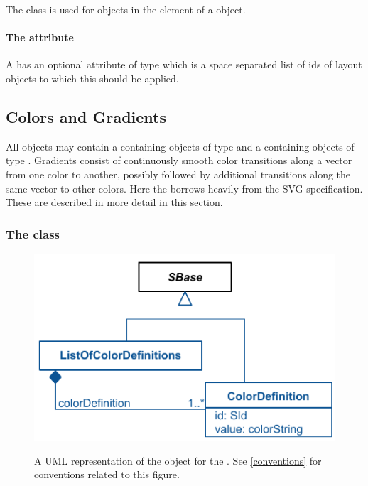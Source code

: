 The \LocalStyle class is used for objects in the \ListOfLocalStyles element of a 
\LocalRenderInformation object.

\paragraph{The \fixttspace{} attribute}

A \LocalStyle has an optional attribute  of type
 which is a space separated list of ids of layout objects to 
which this \Style should be applied.


\subsection{Colors and Gradients}

All \RenderInformation objects may contain a \ListOfColorDefinitions containing 
objects of type \ColorDefinition and a \ListOfGradientDefinitions containing 
objects of type \GradientBase. Gradients consist of continuously smooth color 
transitions along a vector from one color to another, possibly followed by 
additional transitions along the same vector to other colors. Here the \RenderPackage 
borrows heavily from the SVG specification. These are described in more detail in this section. 
 
\subsubsection{The  class}
\label{colordefinition-class}

\begin{figure}[!ht]
  \centering
  \includegraphics{images/render-color-definition-uml}\\
  \caption{A UML representation of the \ColorDefinition object for the \RenderPackage.  See \ref{conventions} for conventions related to this figure. }
  \label{fig:color_render_uml}
\end{figure}


